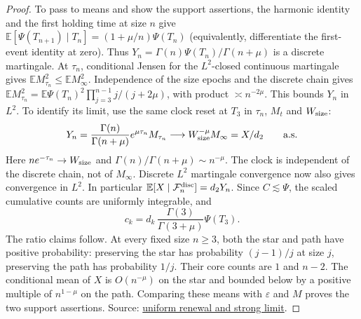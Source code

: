 \documentclass[11pt]{article}
\newcommand{\proofsrc}[2]{\href{https://github.com/uzay-eth/friend-tree-exponent/blob/a0972085ad72ad5685ae7b424988648d1965e73c/#1}{#2}}
\theoremstyle{remark}
\numberwithin{equation}{section}
\begin{document}
\begin{proof}
To pass to means and show the support assertions, the harmonic identity and the first holding time at size $n$ give $\mathbb E[\Psi(T_{n+1})\mid T_n]=(1+\mu/n)\Psi(T_n)$ (equivalently, differentiate the first-event identity at zero). Thus $Y_n=\Gamma(n)\Psi(T_n)/\Gamma(n+\mu)$ is a discrete martingale. At $\tau_n$, conditional Jensen for the $L^2$-closed continuous martingale gives $\mathbb E M_{\tau_n}^2\le\mathbb E M_\infty^2$. Independence of the size epochs and the discrete chain gives $\mathbb E M_{\tau_n}^2=\mathbb E\Psi(T_n)^2\prod_{j=3}^{n-1}j/(j+2\mu)$, with product $\asymp n^{-2\mu}$. This bounds $Y_n$ in $L^2$. To identify its limit, use the same clock reset at $T_3$ in $\tau_n$, $M_t$ and $W_{\rm size}$:
\[
 Y_n=\frac{\Gamma(n)}{\Gamma(n+\mu)}e^{\mu\tau_n}M_{\tau_n}
 \longrightarrow W_{\rm size}^{-\mu}M_\infty=X/d_2
 \qquad\text{a.s.}
\]
Here $ne^{-\tau_n}\to W_{\rm size}$ and $\Gamma(n)/\Gamma(n+\mu)\sim n^{-\mu}$. The clock is independent of the discrete chain, not of $M_\infty$. Discrete $L^2$ martingale convergence now also gives convergence in $L^2$. In particular $\mathbb E[X\mid\mathcal F_n^{\rm disc}]=d_2Y_n$. Since $C\lesssim\Psi$, the scaled cumulative counts are uniformly integrable, and
\begin{equation}\label{eq:core-ck}
 c_k=d_k\,\frac{\Gamma(3)}{\Gamma(3+\mu)}\Psi(T_3).
\end{equation}
The ratio claims follow. At every fixed size $n\ge3$, both the star and path have positive probability: preserving the star has probability $(j-1)/j$ at size $j$, preserving the path has probability $1/j$. Their core counts are $1$ and $n-2$. The conditional mean of $X$ is $O(n^{-\mu})$ on the star and bounded below by a positive multiple of $n^{1-\mu}$ on the path. Comparing these means with $\varepsilon$ and $M$ proves the two support assertions. Source: \proofsrc{round2/proofs/astra/source/round2/standalone/claim-6.md}{uniform renewal and strong limit}.
\end{proof}
\end{document}
